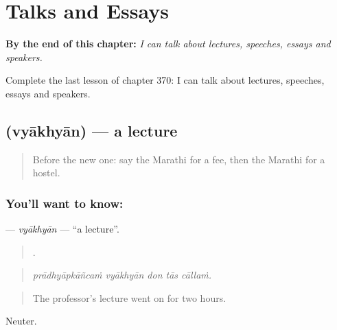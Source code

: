
\chapter{Talks and Essays}
\label{ch:mr-talks-and-essays}

\begin{chapteropening}
\textbf{By the end of this chapter:} \emph{I can talk about lectures, speeches, essays and speakers.}

Complete the last lesson of chapter 370: I can talk about lectures, speeches, essays and speakers.
\end{chapteropening}

\section[\texorpdfstring{\mr{व्याख्यान} (vyākhyān)}{व्याख्यान (vyākhyān)}]{ (vyākhyān) — a lecture}

\label{lesson:MR-C370-vyakhyan}



\begin{quote}
Before the new one: say the Marathi for a fee, then the Marathi for a hostel.
\end{quote}

\subsection*{You'll want to know: }
\textbf{} — \emph{vyākhyān} — \textquotedblleft{}a lecture\textquotedblright{}.

\begin{quote}
    .
\end{quote}

\begin{quote}
\emph{prādhyāpkāñcaṁ vyākhyān don tās cāllaṁ.}
\end{quote}

\begin{quote}
The professor's lecture went on for two hours.
\end{quote}

Neuter.

